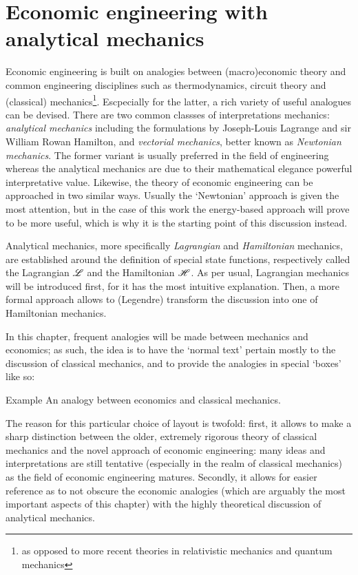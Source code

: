 \chapter{Economic engineering with analytical mechanics}
Economic engineering is built on analogies between (macro)economic theory and common engineering disciplines such as thermodynamics, circuit theory and (classical) mechanics\footnote{as opposed to more recent theories in relativistic mechanics and quantum mechanics}. Escpecially for the latter, a rich variety of useful analogues can be devised. There are two common classses of interpretations mechanics: \emph{analytical mechanics} including the formulations by Joseph-Louis Lagrange and sir William Rowan Hamilton, and \emph{vectorial mechanics}, better known as \emph{Newtonian mechanics}. The former variant is usually preferred in the field of engineering whereas the analytical mechanics are due to their mathematical elegance powerful interpretative value. Likewise, the theory of economic engineering can be approached in two similar ways. Usually the `Newtonian' approach is given the most attention, but in the case of this work the energy-based approach will prove to be more useful, which is why it is the starting point of this discussion instead.

Analytical mechanics, more specifically \emph{Lagrangian} and \emph{Hamiltonian} mechanics, are established around the definition of special state functions, respectively called the Lagrangian \(\mathscr{L}\) and the Hamiltonian \(\mathscr{H}\). As per usual, Lagrangian mechanics will be introduced first, for it has the most intuitive explanation. Then, a more formal approach allows to (Legendre) transform the discussion into one of Hamiltonian mechanics. 

In this chapter, frequent analogies will be made between mechanics and economics; as such, the idea is to have the `normal text' pertain mostly to the discussion of classical mechanics, and to provide the analogies in special `boxes' like so:
\begin{econ}{Example}
    An analogy between economics and classical mechanics.
\end{econ}
The reason for this particular choice of layout is twofold: first, it allows to make a sharp distinction between the older, extremely rigorous theory of classical mechanics and the novel approach of economic engineering: many ideas and interpretations are still tentative (especially in the realm of classical mechanics) as the field of economic engineering matures. Secondly, it allows for easier reference as to not obscure the economic analogies (which are arguably the most important aspects of this chapter) with the highly theoretical discussion of analytical mechanics.


